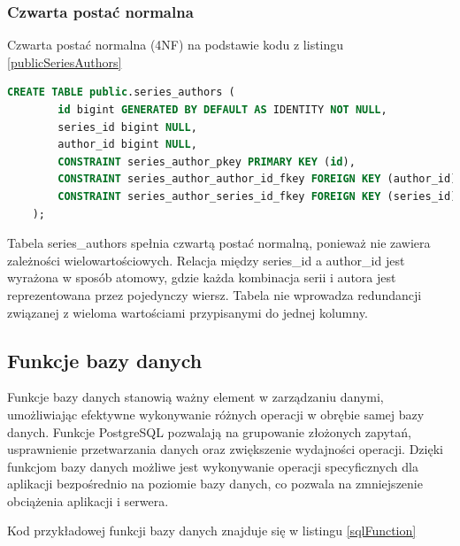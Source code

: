 \documentclass[12pt,twoside]{article}
\begin{document}
\subsubsection{Czwarta postać normalna}

Czwarta postać normalna (4NF) na podstawie kodu z listingu \ref{publicSeriesAuthors}
	\begin{lstlisting}[language=SQL,caption=kod tworzenia tabeli series\_authors, label={publicSeriesAuthors}]
		CREATE TABLE public.series_authors (
		id bigint GENERATED BY DEFAULT AS IDENTITY NOT NULL,
		series_id bigint NULL,
		author_id bigint NULL,
		CONSTRAINT series_author_pkey PRIMARY KEY (id),
		CONSTRAINT series_author_author_id_fkey FOREIGN KEY (author_id) REFERENCES authors(id) ON UPDATE CASCADE ON DELETE CASCADE,
		CONSTRAINT series_author_series_id_fkey FOREIGN KEY (series_id) REFERENCES series(id) ON UPDATE CASCADE ON DELETE CASCADE
	);
\end{lstlisting}
Tabela series\_authors spełnia czwartą postać normalną, ponieważ nie zawiera zależności wielowartościowych. Relacja 
między series\_id a author\_id jest wyrażona w sposób atomowy, gdzie każda kombinacja serii i autora jest 
reprezentowana przez pojedynczy wiersz. Tabela nie wprowadza redundancji związanej z wieloma wartościami 
przypisanymi do jednej kolumny.

\subsection{Funkcje bazy danych}

Funkcje bazy danych stanowią ważny element w zarządzaniu danymi, umożliwiając efektywne wykonywanie różnych operacji 
w obrębie samej bazy danych. Funkcje PostgreSQL pozwalają na grupowanie złożonych zapytań, usprawnienie przetwarzania 
danych oraz zwiększenie wydajności operacji. Dzięki funkcjom bazy danych możliwe jest wykonywanie operacji 
specyficznych dla aplikacji bezpośrednio na poziomie bazy danych, co pozwala na zmniejszenie obciążenia aplikacji i 
serwera.

Kod przykładowej funkcji bazy danych znajduje się w listingu \ref{sqlFunction}
\end{document}
